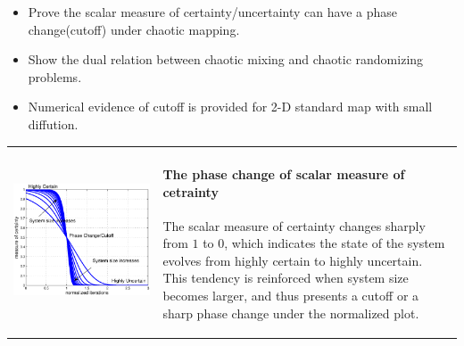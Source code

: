 \documentclass[landscape,a0b,final]{a0poster}
\newenvironment{poster}{
  \begin{center}
  \begin{minipage}[c]{0.98\textwidth}
}{
  \end{minipage} 
  \end{center}
}
\newenvironment{pcolumn}[1]{
  \begin{minipage}{#1\textwidth}
  \begin{center}
}{
  \end{center}
  \end{minipage}
}
\newcommand{\pbox}[4]{
\psshadowbox[#3]{
\begin{minipage}[t][#2][t]{#1}
#4
\end{minipage}
}}
\begin{document}
\begin{poster}
\begin{center}
\begin{pcolumn}{0.32}
{%
\begin{center}\pbox{0.8\textwidth}{}{linewidth=2mm,framearc=0.1,linecolor=red,fillstyle=gradient,gradangle=0,gradbegin=white,gradend=whitered,gradmidpoint=1.0,framesep=1em}{\begin{center}\bfseries{\large{Introduction}}\end{center}}\end{center}
\vspace{1.25cm}
\begin{itemize}
 \item Prove the scalar measure of certainty/uncertainty can have a phase change(cutoff) under chaotic mapping. 
 \item Show the dual relation between chaotic mixing and chaotic randomizing problems.
 \item Numerical evidence of cutoff is provided for 2-D standard map with small diffution. 
\end{itemize}

\begin{tabular}{c|l}
  \includegraphics[width=0.55\hsize]{democutoffn}&
  \begin{minipage}[b]{0.43\hsize}
  \paragraph{The phase change of scalar measure of cetrainty}
  The scalar measure of certainty changes sharply from $1$ to $0$, which indicates the state of the system evolves from highly certain to highly uncertain. This tendency is reinforced when system size becomes larger, and thus presents a cutoff or a sharp phase change under the normalized plot.   
  \end{minipage}
\end{tabular}


}
\end{pcolumn}
\end{center}
\end{poster}
\end{document}
